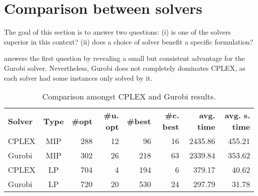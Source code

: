 \section{Comparison between solvers}
\label{sec:results_comparing_solvers}

The goal of this section is to answer two questions:
(i) is one of the solvers superior in this context?
(ii) does a choice of solver benefit a specific formulation?

 answers the first question by revealing a small but consistent advantage for the Gurobi solver.
Nevertheless, Gurobi does not completely dominates CPLEX, as each solver had some instances only solved by it.

\begin{table}[h]
  \center
  \caption{Comparison amongst CPLEX and Gurobi results.}
  \setlength{}
  \begin{tabular}{lcrrrrrr}
    \hline\hline
    \textbf{Solver} & \textbf{Type} & \textbf{\#opt} & \textbf{\#u. opt} & \textbf{\#best} & \textbf{\#c. best} & \textbf{avg. time} & \textbf{avg. s. time} \\\cmidrule(lr){1-2}\cmidrule(lr){3-8}
     CPLEX & MIP & 288 & 12 &  96 & 16 & 2435.86 & 455.21 \\
    Gurobi & MIP & 302 & 26 & 218 & 63 & 2339.84 & 353.62 \\
     CPLEX & LP  & 704 &  4 & 194 &  6 &  379.17 &  40.62 \\
    Gurobi & LP  & 720 & 20 & 530 & 24 &  297.79 &  31.78 \\\hline\hline
  \end{tabular}
  \label{tab:cplex_vs_gurobi}
\end{table}

